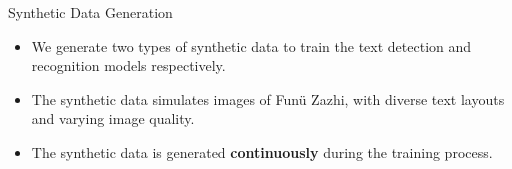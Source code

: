 \documentclass{beamer}
\begin{document}
\begin{frame}
    \begin{center}
        \Large{Synthetic Data Generation}
    \end{center}
    \begin{itemize}
        \item We generate two types of synthetic data to train the text detection and recognition models respectively.
        \item The synthetic data simulates images of Funü Zazhi, with diverse text layouts and varying image quality.
        \item The synthetic data is generated \textbf{continuously} during the training process.
    \end{itemize}
\end{frame}
\end{document}
